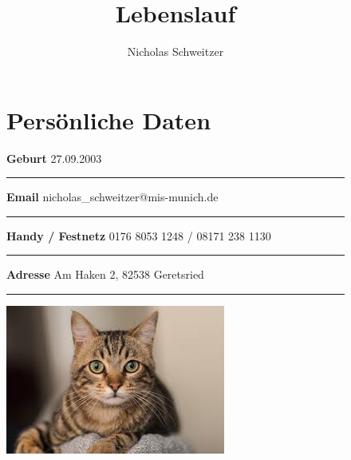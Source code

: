 \documentclass[12pt]{article}
\title{\vspace{-110pt}\LARGE Lebenslauf\vspace{-18pt}}
\author{\LARGE Nicholas Schweitzer}
\date{}
\newcommand{\sect}[1]{
  {
    \vspace{12pt}
    \section*{
      \fontsize{18}{0}\selectfont
      \hspace{-12pt}
      \vspace{-12pt}
      #1
    }
    \vspace{-6pt}
  }
}
\newcommand{\sep}{{\color{gray}\vspace{-12pt}\hrule}}
\begin{document}
\maketitle
\vspace{-32pt}


\begin{figure}[htb!]
  \begin{minipage}{0.7\textwidth}
    \sect{Pers{\"o}nliche Daten}
    \vspace{7pt}

    \textbf{Geburt} \hfill{27.09.2003} \, \\
    \sep
    \vspace{7pt}
    \textbf{Email} \hfill{nicholas\_schweitzer@mis-munich.de} \, \\
    \sep
    \vspace{7pt}
    \textbf{Handy / Festnetz} \hfill{0176 8053 1248 / 08171 238 1130} \, \\
    \sep
    \vspace{7pt}
    \textbf{Adresse} \hfill{Am Haken 2, 82538 Geretsried \, }\\
    \sep
    \vspace{7pt}
  \end{minipage}
  \begin{minipage}{0.2\textwidth}
    \includegraphics[trim=-20 60 0 0mm, scale=0.5]{cat.jpg}
  \end{minipage}
\end{figure}
\vspace{-30pt}
\end{document}
